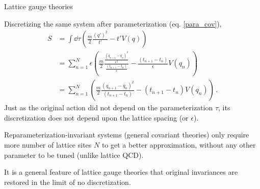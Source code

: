 \documentclass[12pt,titlepage]{article}
\begin{document}
\begin{frame}{Lattice gauge theories}
    \begin{list}{\,}{\leftmargin=1em \itemindent=0em}
        \item<1-> Discretizing the same system after parameterization (eq. \ref{para_cov}),
        \begin{align}
            S&=\int\dd{\tau}\left(\frac{m}{2}\frac{(q')^2}{t'}-t'V(q)\right)\\
            &=\sum_{n=1}^N\epsilon\left(\frac{m}{2}\frac{\frac{(q_{n+1}-q_n)^2}{\epsilon^2}}{\frac{(t_{n+1}-t_n)}{\epsilon}}-\frac{(t_{n+1}-t_n)}{\epsilon}V(q_n)\right)\\
            &=\sum_{n=1}^N\left(\frac{m}{2}\frac{(q_{n+1}-q_n)^2}{(t_{n+1}-t_n)}-(t_{n+1}-t_n)V(q_n)\right)\,.
        \end{align}
        Just as the original action did not depend on the parameterization $\tau$, its discretization does not depend upon the lattice spacing (or $\epsilon$).
        \item<2-> Reparameterization-invariant systems (general covariant theories) only require more number of lattice sites $N$ to get a better approximation, without any other parameter to be tuned (unlike lattice QCD).
        \item<3-> It is a general feature of lattice gauge theories that original invariances are restored in the limit of no discretization.
    \end{list}
\end{frame}

\end{document}

